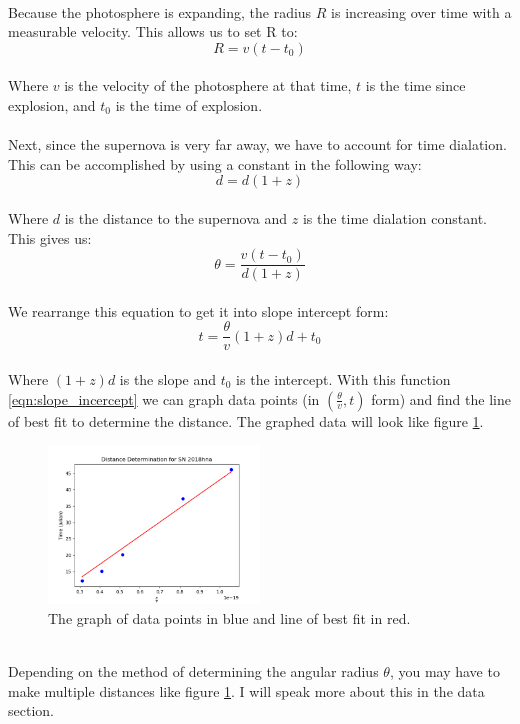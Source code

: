 \\
Because the photosphere is expanding, the radius $R$ is increasing over time with a measurable velocity. This allows us to set R to:
\\
\begin{equation}\label{eqn:radius}
    R = v(t-t_0)
\end{equation}
\\
Where $v$ is the velocity of the photosphere at that time, $t$ is the time since explosion, and $t_0$ is the time of explosion.
\\
\\
Next, since the supernova is very far away, we have to account for time dialation. This can be accomplished by using a constant in the following way:
\\
\begin{equation}\label{eqn:distance}
    d = d(1+z)
\end{equation}
\\
Where $d$ is the distance to the supernova and $z$ is the time dialation constant.
\\
This gives us:
\\
\begin{equation}\label{eqn:pre_linear}
    \theta = \frac{v(t-t_0)}{d(1+z)}
\end{equation}
\\
We rearrange this equation to get it into slope intercept form:
\\
\begin{equation}\label{eqn:slope_incercept}
    t = \frac{\theta}{v}(1+z)d + t_0
\end{equation}
\\
Where $(1+z)d$ is the slope and $t_0$ is the intercept. With this function \ref{eqn:slope_incercept} 
we can graph data points (in $(\frac{\theta}{v}, t)$ form) and find the line of best fit to determine the distance.
The graphed data will look like figure \ref{fig:distance_graph}.
\\
\begin{figure} [h!]
    \begin{center}
    \includegraphics[width=0.5\textwidth]{Distance_Graph.png}
    \end{center}
    \label{fig:distance_graph}
    \caption{The graph of data points in blue and line of best fit in red.}    
\end{figure}
\\
Depending on the method of determining the angular radius $\theta$, you may have to make multiple distances 
like figure \ref{fig:distance_graph}. I will speak more about this in the data section.




